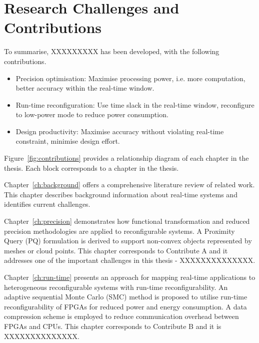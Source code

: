 \section{Research Challenges and Contributions}


To summarise, XXXXXXXXX has been developed, with the following contributions.

\begin{itemize}
\item Precision optimisation: Maximise processing power, i.e. more computation, better accuracy within the real-time window. 
\item Run-time reconfiguration: Use time slack in the real-time window, reconfigure to low-power mode to reduce power consumption. 
\item Design productivity: Maximise accuracy without violating real-time constraint, minimise design effort.  
\end{itemize}



Figure~\ref{fig:contributions} provides a relationship diagram of each chapter in the thesis.
Each block corresponds to a chapter in the thesis.

Chapter~\ref{ch:background} offers a comprehensive literature review of related work.
This chapter describes background information about real-time systems and identifies current challenges.

Chapter~\ref{ch:precision} demonstrates how functional transformation and reduced precision methodologies are applied to reconfigurable systems.
A Proximity Query (PQ) formulation is derived to support non-convex objects represented by meshes or cloud points. 
This chapter corresponds to Contribute A and it addresses one of the important challenges in this thesis - XXXXXXXXXXXXXX.

Chapter~\ref{ch:run-time} presents an approach for mapping real-time applications to heterogeneous reconfigurable systems with run-time reconfigurability.
An adaptive sequential Monte Carlo (SMC) method is proposed to utilise run-time reconfigurability of FPGAs for reduced power and energy consumption. 
A data compression scheme is employed to reduce communication overhead between FPGAs and CPUs.
This chapter corresponds to Contribute B and it is XXXXXXXXXXXXXX.

